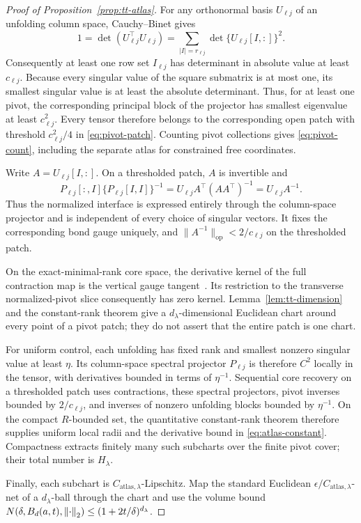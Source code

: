 \begin{proof}[Proof of Proposition~\ref{prop:tt-atlas}]
For any orthonormal basis \(U_{\ell j}\) of an unfolding column space,
Cauchy--Binet gives
\[
 1=\det(U_{\ell j}^\top U_{\ell j})
 =\sum_{|I|=r_{\ell j}}\det\{U_{\ell j}[I,:]\}^2.
\]
Consequently at least one row set \(I_{\ell j}\) has determinant in absolute
value at least \(c_{\ell j}\). Because every singular value of the square
submatrix is at most one, its smallest singular value is at least the absolute
determinant. Thus, for at least one pivot, the corresponding principal block
of the projector has smallest eigenvalue at least \(c_{\ell j}^2\). Every
tensor therefore belongs to the corresponding open patch with threshold
\(c_{\ell j}^2/4\) in \cref{eq:pivot-patch}. Counting pivot collections gives
\cref{eq:pivot-count}, including the separate atlas for constrained free
coordinates.

Write \(A=U_{\ell j}[I,:]\). On a thresholded patch, \(A\) is invertible and
\[
 P_{\ell j}[:,I]\{P_{\ell j}[I,I]\}^{-1}
 =U_{\ell j}A^\top(AA^\top)^{-1}
 =U_{\ell j}A^{-1}.
\]
Thus the normalized interface is expressed entirely through the column-space
projector and is independent of every choice of singular vectors. It fixes
the corresponding bond gauge uniquely, and \(\|A^{-1}\|_{\mathrm{op}}<
2/c_{\ell j}\) on the thresholded patch.

On the exact-minimal-rank core space, the derivative kernel of the full
contraction map is the vertical gauge tangent~\citep{holtz2012manifolds}.
Its restriction to the transverse normalized-pivot slice consequently has
zero kernel. Lemma~\ref{lem:tt-dimension} and the constant-rank theorem give
a \(d_\lambda\)-dimensional Euclidean chart around every point of a pivot
patch; they do not assert that the entire patch is one chart.

For uniform control, each unfolding has fixed rank and smallest nonzero
singular value at least \(\eta\). Its column-space spectral projector
\(P_{\ell j}\) is therefore \(C^2\) locally in the tensor, with derivatives
bounded in terms of \(\eta^{-1}\).
Sequential core recovery on a thresholded patch uses contractions, these
spectral projectors, pivot inverses bounded by \(2/c_{\ell j}\), and inverses
of nonzero unfolding blocks bounded by \(\eta^{-1}\). On the compact
\(R\)-bounded set, the quantitative constant-rank theorem therefore supplies
uniform local radii and the derivative bound in
\cref{eq:atlas-constant}. Compactness extracts finitely many such subcharts
over the finite pivot cover; their total number is \(H_\lambda\).

Finally, each subchart is \(C_{\mathrm{atlas},\lambda}\)-Lipschitz. Map the
standard Euclidean \(\epsilon/C_{\mathrm{atlas},\lambda}\)-net of a
\(d_\lambda\)-ball through the chart and use the volume bound
\(N(\delta,B_d(a,t),\left\lVert \cdot\right\rVert_2)\le(1+2t/\delta)^{d_\lambda}\).
\end{proof}

